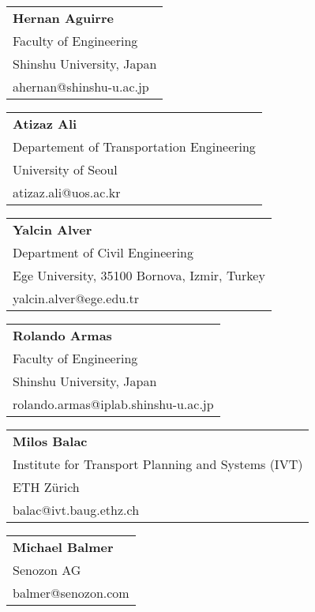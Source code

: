 \begin{tabular}[width=0.48\textwidth]{@{}l}
\textbf{Hernan Aguirre} \\
Faculty of Engineering \\
Shinshu University, Japan \\
ahernan@shinshu-u.ac.jp  \\
\end{tabular}

\begin{tabular}[width=0.48\textwidth]{@{}l}
\textbf{Atizaz Ali} \\
Departement of Transportation Engineering \\
University of Seoul \\
atizaz.ali@uos.ac.kr \\
\end{tabular}

\begin{tabular}[width=0.48\textwidth]{@{}l}
\textbf{Yalcin Alver} \\
Department of Civil Engineering \\
Ege University, 35100 Bornova, Izmir, Turkey \\
yalcin.alver@ege.edu.tr \\
\end{tabular}

\begin{tabular}[width=0.48\textwidth]{@{}l}
\textbf{Rolando Armas} \\
Faculty of Engineering \\
Shinshu University, Japan \\
rolando.armas@iplab.shinshu-u.ac.jp \\
\end{tabular}

\begin{tabular}[width=0.48\textwidth]{@{}l}
\textbf{Milos Balac} \\
Institute for Transport Planning and Systems (IVT) \\
ETH Zürich \\
balac@ivt.baug.ethz.ch \\
\end{tabular}

\begin{tabular}[width=0.48\textwidth]{@{}l}
\textbf{Michael Balmer} \\
Senozon AG \\
balmer@senozon.com \\
\end{tabular}

